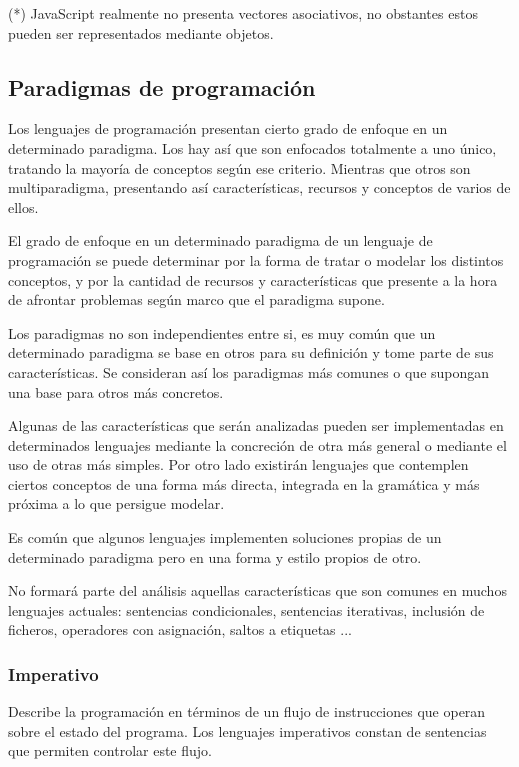 (*) JavaScript realmente no presenta vectores asociativos, no obstantes estos
pueden ser representados mediante objetos. 


\subsection{Paradigmas de programación}

Los lenguajes de programación presentan cierto grado de enfoque en un determinado paradigma. Los hay así 
que son enfocados totalmente a uno único, tratando la mayoría de conceptos según ese criterio. Mientras 
que otros son multiparadigma, presentando  así características, recursos y conceptos de varios de ellos. 

El grado de enfoque en un determinado paradigma de un lenguaje de programación se puede determinar 
por la forma de tratar o modelar los distintos conceptos, y por la cantidad de recursos y características que 
presente a la hora de afrontar problemas según marco que el paradigma supone. 

Los paradigmas no son independientes entre si, es muy común que un determinado paradigma se 
base en otros para su definición y tome parte de sus características. Se consideran así
los paradigmas más comunes o que supongan una base para otros más concretos.

Algunas de las características que serán analizadas pueden ser 
implementadas en determinados lenguajes mediante la concreción de otra más general o mediante el uso de otras más simples. 
Por otro lado existirán lenguajes que contemplen ciertos
conceptos de una forma más directa, integrada en la gramática y más próxima a lo que persigue modelar.

Es común que algunos lenguajes implementen soluciones propias de un determinado paradigma pero en una forma y estilo
propios de otro.


No formará parte del análisis aquellas características que
son comunes en muchos lenguajes actuales: sentencias condicionales, sentencias iterativas, inclusión de ficheros, operadores con
asignación, saltos a etiquetas ...

\subsubsection {Imperativo}
Describe la programación en términos de un flujo de instrucciones que operan sobre el estado del programa. Los lenguajes
imperativos constan de sentencias que permiten controlar este flujo.

